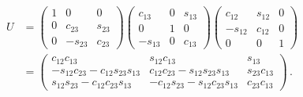 \begin{align}
    U &=
    \begin{pmatrix}1 & 0 & 0 \\ 0 & c_{23} & s_{23} \\ 0 & -s_{23} & c_{23}\end{pmatrix}
\begin{pmatrix}c_{13} & 0 & s_{13} \\ 0 & 1 & 0 \\ -s_{13}  & 0 & c_{13}\end{pmatrix}
\begin{pmatrix}c_{12} & s_{12} & 0 \\ -s_{12} & c_{12} & 0 \\ 0 & 0 & 1\end{pmatrix} \nonumber \\
    &= 
    \begin{pmatrix}c_{12} c_{13} & s_{12} c_{13} & s_{13} \\ 
        -s_{12} c_{23}-c_{12} s_{23} s_{13} & c_{12} c_{23}-s_{12} s_{23} s_{13} & s_{23} c_{13} \\ 
        s_{12} s_{23}-c_{12} c_{23} s_{13}  & -c_{12} s_{23}-s_{12} c_{23} s_{13} & c_{23} c_{13}
    \end{pmatrix}\,.
\end{align}

